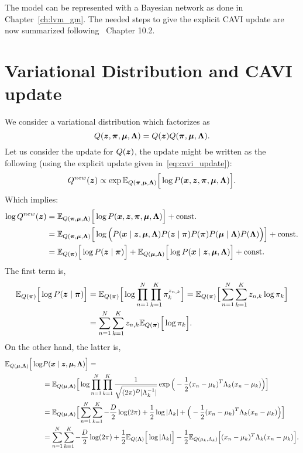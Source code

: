 The model can be represented with a Bayesian network as done in Chapter~\ref{ch:lvm_gm}. The needed steps to give the explicit CAVI update are now summarized following~\cite{bishop2006pattern} Chapter 10.2.

\section{Variational Distribution and CAVI update}

We consider a variational distribution which factorizes as
\[
  Q(\bm{z}, \bm{\pi}, \bm{\mu}, \bm{\Lambda}) = Q(\bm{z})Q(\bm{\pi}, \bm{\mu}, \bm{\Lambda}).
\]
Let us consider the update for \(Q(\bm{z})\), the update might be written as the following (using the explicit update given in~\ref{eq:cavi_update}):
\[
  Q^{new}(\bm{z}) \propto \exp \mathbb{E}_{Q(\bm{\pi}, \bm{\mu}, \bm{\Lambda})}\Big[\log P(\bm{x}, \bm{z}, \bm{\pi}, \bm{\mu}, \bm{\Lambda})\Big].
\]
Which implies:
\[
  \begin{aligned}
    \log Q^{new}(\bm{z}) &= \mathbb{E}_{Q(\bm{\pi}, \bm{\mu}, \bm{\Lambda})}\Big[\log P(\bm{x}, \bm{z}, \bm{\pi}, \bm{\mu}, \bm{\Lambda})\Big] + \text{const.}\\
    &= \mathbb{E}_{Q(\bm{\pi}, \bm{\mu}, \bm{\Lambda})}\Big[\log \Big( P(\bm{x} \mid \bm{z}, \bm{\mu}, \bm{\Lambda})P(\bm{z} \mid \bm{\pi})P(\bm{\pi})P(\bm{\mu} \mid \bm{\Lambda})P(\bm{\Lambda}) \Big)\Big] + \text{const.}\\
    &= \mathbb{E}_{Q(\bm{\pi})}\Big[\log P(\bm{z} \mid \bm{\pi})\Big] + \mathbb{E}_{Q(\bm{\mu}, \bm{\Lambda})}\Big[\log P(\bm{x} \mid \bm{z}, \bm{\mu}, \bm{\Lambda})\Big] + \text{const.}
  \end{aligned}
\]
The first term is,
\[
  \begin{aligned}
    \mathbb{E}_{Q(\bm{\pi})}\Big[\log P(\bm{z} \mid \bm{\pi})\Big] &=  \mathbb{E}_{Q(\bm{\pi})}\Big[\log \prod_{n=1}^{N}\prod_{k=1}^{K}\pi_{k}^{z_{n,k}}\Big] = \mathbb{E}_{Q(\bm{\pi})}\Big[\sum_{n=1}^{N}\sum_{k=1}^{K}z_{n,k}\log \pi_{k}\Big]\\
    &= \sum_{n=1}^{N}\sum_{k=1}^{K}z_{n,k} \mathbb{E}_{Q(\bm{\pi})}\Big[\log \pi_{k}\Big].
  \end{aligned}
\]
On the other hand, the latter is,
\[
    \begin{aligned}
    \mathbb{E}_{Q(\bm{\mu}, \bm{\Lambda})}\Big[\log& P(\bm{x} \mid \bm{z}, \bm{\mu}, \bm{\Lambda})\Big] =\\
    &=  \mathbb{E}_{Q(\bm{\mu}, \bm{\Lambda})}\Big[\log \prod_{n=1}^{N}\prod_{k=1}^{K} \frac{1}{\sqrt{(2\pi)^{D}|\Lambda_{k}^{-1}|}} \exp \Big( -\frac{1}{2}{(x_{n} - \mu_{k})}^{T}\Lambda_{k}(x_{n}- \mu_{k}) \Big)  \Big]\\
    &=  \mathbb{E}_{Q(\bm{\mu}, \bm{\Lambda})}\Big[ \sum_{n=1}^{N}\sum_{k=1}^{K}- \frac{D}{2}\log (2\pi)+  \frac{1}{2}\log |\Lambda_{k}|+ \Big( -\frac{1}{2}{(x_{n} - \mu_{k})}^{T}\Lambda_{k}(x_{n}- \mu_{k}) \Big)  \Big]\\
    &=  \sum_{n=1}^{N}\sum_{k=1}^{K}  - \frac{D}{2} \log (2\pi)+ \frac{1}{2}\mathbb{E}_{Q(\bm{\Lambda})}\Big[\log |\Lambda_{k}|\Big]- \frac{1}{2}\mathbb{E}_{Q(\mu_{k}, \Lambda_{k})}\Big[(x_{n} - \mu_{k})^{T}\Lambda_{k}(x_{n} - \mu_{k})\Big].
    \end{aligned}
\]
